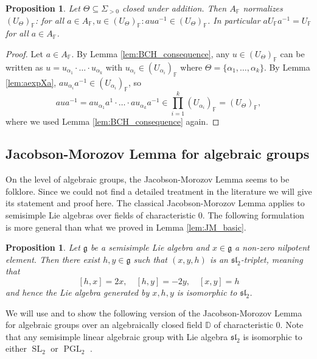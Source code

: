 \documentclass[12pt]{amsart}
\newcommand{\F}{\mathbb{F} }
\newcommand{\D}{\mathbb{D} }
\newcommand{\frakg}{\mathfrak{g}}
\numberwithin{equation}{section}
\newtheorem{proposition}[theorem]{Proposition}
\theoremstyle{remark} %
\begin{document}
\begin{proposition} \label{prop:anainN}
	Let $\Theta \subseteq \Sigma_{>0}$ closed under addition. Then $A_\F$ normalizes $(U_\Theta)_\F$: for all $a \in A_\F, u \in (U_\Theta)_\F \colon aua^{-1} \in (U_\Theta)_\F$.
	In particular $aU_\F a^{-1} = U_\F$ for all $a \in A_\F$.
\end{proposition}
\begin{proof}
	Let $a \in A_\F$. By Lemma \ref{lem:BCH_consequence}, any $u\in (U_\Theta)_\F$ can be written as $u = u_{\alpha_1} \cdot \ldots \cdot u_{\alpha_k}$ with $u_{\alpha_i} \in (U_{\alpha_i})_\F$ where $\Theta = \{\alpha_1, \ldots , \alpha_k\}$. By Lemma \ref{lem:aexpXa}, $au_{\alpha_i}a^{-1} \in (U_{\alpha_i})_\F$, so
	$$
	aua^{-1} = au_{\alpha_1}a^{1} \cdot \ldots \cdot au_{\alpha_k}a^{-1} \in \prod_{i=1}^k (U_{\alpha_i})_\F = (U_\Theta)_\F,
	$$
	where we used Lemma \ref{lem:BCH_consequence} again.
\end{proof}



\subsection{Jacobson-Morozov Lemma for algebraic groups}\label{sec:Jacobson_Morozov}

On the level of algebraic groups, the Jacobson-Morozov Lemma seems to be folklore. Since we could not find a detailed treatment in the literature we will give its statement and proof here. The classical Jacobson-Morozov Lemma applies to semisimple Lie algebras over fields of characteristic $0$. The following formulation is more general than what we proved in Lemma \ref{lem:JM_basic}.
\begin{proposition}\label{prop:Jacobson_Morozov_algebra}
	\cite[VIII \S 11.2 Prop. 2]{Bou08_789} Let $\frakg$ be a semisimple Lie algebra and $x\in \frakg$ a non-zero nilpotent element. Then there exist $h,y \in \frakg$ such that $(x,y,h)$ is an $\mathfrak{sl}_2$-triplet, meaning that 
	$$
	[h,x] = 2x, \quad [h,y] = -2y, \quad [x,y] = h
	$$
	and hence the Lie algebra generated by $x,h,y$ is isomorphic to $\mathfrak{sl}_2$.  
\end{proposition} %
 
We will use \cite[Chapter 7]{Bor} and \cite{PR93} to show the following version of the Jacobson-Morozov Lemma for algebraic groups over an algebraically closed field $\D$ of characteristic $0$. Note that any semisimple linear algebraic group with Lie algebra $\mathfrak{sl}_2$ is isomorphic to either $\operatorname{SL}_2$ or $\operatorname{PGL}_2$ \cite[Corollary 32.2]{Hum1}. 
\end{document}
